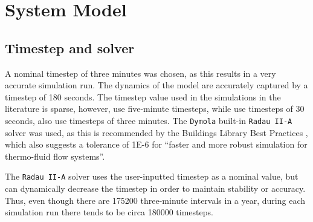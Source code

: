 \chapter{System Model}\label{ch:model} 


\section{Timestep and solver}
A nominal timestep of three minutes was chosen, as this results in a very accurate simulation run. The dynamics of the model are accurately captured by a timestep of 180 seconds. The timestep value used in the simulations in the literature is sparse, however, \citeauthor{roccatello_analysis_2022} \cite{roccatello_analysis_2022} use five-minute timesteps, while \citeauthor{dongellini_influence_2021} \cite{dongellini_influence_2021} use timesteps of 30 seconds, \citeauthor{klein_numerical_2014} \cite{klein_numerical_2014} also use timesteps of three minutes. The \texttt{Dymola} built-in \texttt{Radau II-A} solver was used, as this is recommended by the Buildings Library Best Practices \cite{lawrence_berkeley_national_laboratory_user_2022}, which also suggests a tolerance of \num{1E-6} for ``faster and more robust simulation for thermo-fluid flow systems''. 

The \texttt{Radau II-A} solver uses the user-inputted timestep as a nominal value, but can dynamically decrease the timestep in order to maintain stability or accuracy. Thus, even though there are \num{175200} three-minute intervals in a year, during each simulation run there tends to be circa \num{180000} timesteps. 


